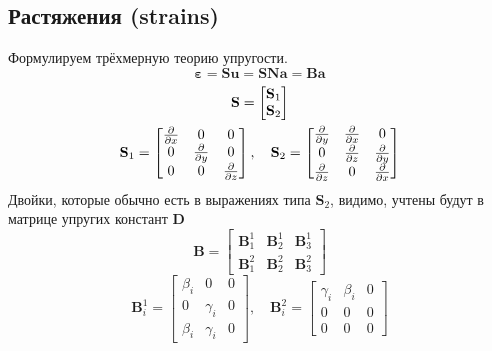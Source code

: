 \documentclass[12pt,a4paper,fleqn]{article}
\begin{document}
	\subsection{Растяжения (strains)}
		Формулируем трёхмерную теорию упругости. 
		\begin{equation}
			\mathbf{\varepsilon} = \mathbf{Su} = \mathbf{SNa} = \mathbf{Ba}
		\end{equation}	
		\begin{gather}
			\mathbf{S} = \begin{bmatrix}
					\mathbf{S}_1 \\
					\mathbf{S}_2
					\end{bmatrix} \notag \\
			\mathbf{S}_1 = \begin{bmatrix}
				\frac{\partial}{\partial x}	&	0				&	0	\\	
							0	&	\frac{\partial}{\partial y}	&	0	\\	
							0	&	0				&	\frac{\partial}{\partial z}
					\end{bmatrix} , \quad 
			\mathbf{S}_2 = \begin{bmatrix}
				\frac{\partial}{\partial y}	&	\frac{\partial}{\partial x}	&	0	\\	
							0	&	\frac{\partial}{\partial z}	&	\frac{\partial}{\partial y}	\\	
				\frac{\partial}{\partial z}	&	0				&	\frac{\partial}{\partial x}
					\end{bmatrix} 
		\end{gather}	
		Двойки, которые обычно есть в выражениях типа $\mathbf{S}_2$, видимо, учтены будут в матрице упругих констант $\mathbf{D}$
		\begin{equation}
			\mathbf{B} = \begin{bmatrix}
					\mathbf{B}_1^1 & \mathbf{B}_2^1 & \mathbf{B}_3^1 \\
					\mathbf{B}_1^2 & \mathbf{B}_2^2 & \mathbf{B}_3^2 
					\end{bmatrix}
		\end{equation}
		\begin{equation}
			\mathbf{B}_i^1 = 
				\begin{bmatrix}
					\beta_i 	& 0 		& 0 \\
					0 		& \gamma_i  	& 0 \\
					\beta_i		& \gamma_i	& 0
				\end{bmatrix}, \quad
			\mathbf{B}_i^2 = 
				\begin{bmatrix}
					\gamma_i 	& \beta_i 	& 0 \\
					0 		& 0 		& 0 \\
					0		& 0		& 0
				\end{bmatrix}
		\end{equation}
\end{document}
